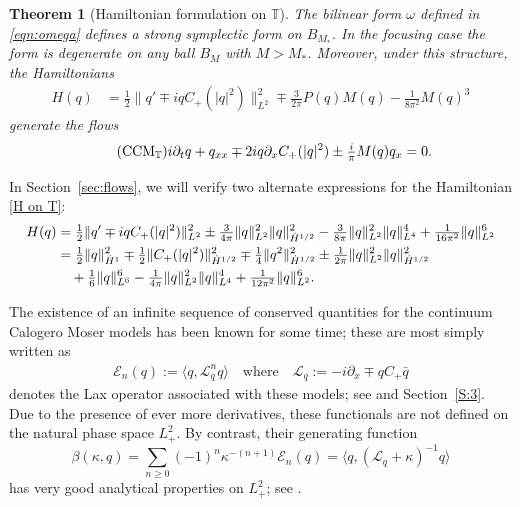 \documentclass{amsart}
\numberwithin{equation}{section}
\newtheorem{theorem}{Theorem}[section]
\theoremstyle{definition}
\newcommand{\om}{\omega}
\newcommand{\ka}{\kappa}
\newcommand{\T}{\mathbb{T}}
\newcommand{\Lc}{\mathcal{L}}
\newcommand{\dd}{\partial}
\newcommand{\qtq}[1]{\quad\text{#1}\quad}
\begin{document}
\begin{theorem}[Hamiltonian formulation on $\T$]\label{T:T}
The bilinear form $\om$ defined in \eqref{eqn:omega} defines a strong symplectic form on $B_{M_*}$.  In the focusing case the form is degenerate on any ball $B_M$ with $M>M_*$.  Moreover, under this structure, the Hamiltonians
\begin{align}\label{H on T}
H(q)&=\tfrac12\|q'\mp i qC_+(|q|^2)\|_{L^2}^2\mp \tfrac{3}{2\pi} P(q) M(q) - \tfrac1{8\pi^2}M(q)^3
\end{align}
generate the flows
\begin{equation}\label{CCMT}\tag{CCM${}_\T$}
i\dd_t q+q_{xx}\mp2iq\dd_x C_+(|q|^2)\pm \tfrac{i}\pi M(q)q_x=0.
\end{equation}
\end{theorem}

In Section~\ref{sec:flows}, we will verify two alternate expressions for the Hamiltonian \eqref{H on T}:
\begin{align}\label{eqn:H(q) T}
H(q)&=\tfrac12\|q'\mp i qC_+(|q|^2)\|_{L^2}^2\pm \tfrac{3}{4\pi} \|q\|_{L^2}^2\|q\|_{\dot{H}^{1/2}}^2-\tfrac{3}{8\pi}\|q\|_{L^2}^2\|q\|_{L^4}^4+\tfrac{1}{16\pi^2}\|q\|_{L^2}^6\notag\\
&= \tfrac12\|q\|_{\dot{H}^{1}}^2\mp\tfrac12\| C_+(|q|^2)\|_{\dot{H}^{1/2}}^2\mp\tfrac14\|q^2\|_{\dot{H}^{1/2}}^2\pm \tfrac1{2\pi}\|q\|_{L^2}^2\|q\|_{\dot{H}^{1/2}}^2\\
&\quad+\tfrac{1}{6}\|q\|_{L^6}^6-\tfrac1{4\pi}\|q\|_{L^2}^2\|q\|_{L^4}^4+\tfrac{1}{12\pi^2}\|q\|_{L^2}^6  . \notag
\end{align}

The existence of an infinite sequence of conserved quantities for the continuum Calogero Moser models has been known for some time; these are most simply written as
\begin{align}\label{En defn}
\mathcal E_n(q) := \langle q,\Lc_q^n q\rangle \qtq{where} \Lc_q :=-i\dd_x \mp qC_+\bar{q}
\end{align}
denotes the Lax operator associated with these models; see \cite{badreddine2024global,gerard2024calogero} and Section~\ref{S:3}.   Due to the presence of ever more derivatives, these functionals are not defined on the natural phase space $L^2_+$.  By contrast, their generating function
\begin{equation}\label{beta as GF}
\beta(\ka,q)=\sum_{n\geq0}(-1)^n\ka^{-(n+1)}\mathcal{E}_n(q) = \langle q, (\Lc_q + \kappa)^{-1} q\rangle
\end{equation}
has very good analytical properties on $L^2_+$; see \cite{killip2023scaling}.
\end{document}
